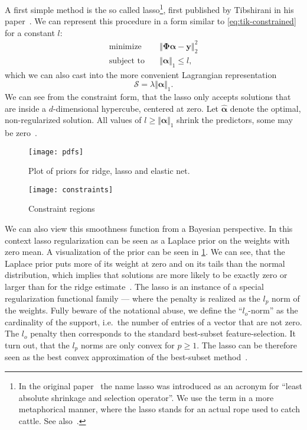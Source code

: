 A first simple method is the so called lasso\footnote{In the original
  paper~\cite{lasso} the name lasso  was introduced as an
  acronym for ``least absolute shrinkage and selection operator''.
We use the term in a more metaphorical manner, where the lasso stands for an
actual rope used to catch cattle. See also~\cite{sparse-learning}.},
first published by Tibshirani in his paper~\cite{lasso}. %
We can represent this procedure in a form similar to \cref{eq:tik-constrained} for a constant \(l\):
\begin{align}\label{eq:lasso-constrained}
\text{minimize} \quad &
 \left\Vert  \bm{\Phi} \bm{\alpha} - \bm{y}  \right\Vert_2^2 \\
\text{subject to} \quad & \Vert \bm{\alpha}  \Vert_1 \leq l,
\end{align}
which we can also cast into the more convenient Lagrangian representation
\begin{equation*}
\mathcal{S} = \lambda \Vert \bm{\alpha} \Vert_1.
\end{equation*}
We can see from the constraint form, that the lasso only accepts solutions that
are inside a \(d\)-dimensional hypercube, centered at zero.
Let \(\hat{\bm{\alpha}}\) denote the optimal, non-regularized solution.
All values of \(l \geq \Vert \bm{\alpha} \Vert_1\) shrink the predictors, some
may be zero~\cite{lasso}.

\begin{figure}[tb]
    \centering
    \texttt{[image: pdfs]}
    \caption{Plot of priors for ridge, lasso and elastic net.}\label{fig:reg-pdfs}
\end{figure}
\begin{figure}[tb]
    \centering
    \texttt{[image: constraints]}
    \caption{Constraint regions}
\end{figure}

We can also view this smoothness function from a Bayesian perspective.
In this context lasso regularization can be seen as a Laplace prior on the
weights with zero mean.
A visualization of the prior can be seen in \cref{fig:reg-pdfs}.
We can see, that the Laplace prior puts more of its weight at zero and on its
tails than the normal distribution, which implies that solutions are more likely
to be exactly zero or larger than for the ridge estimate~\cite{lasso}.
The lasso is an instance of a special regularization functional family --- where
the penalty is realized as the \(l_p\) norm of the weights.
Fully beware of the notational abuse, we define the ``\(l_o\)-norm'' as the
cardinality of the support, i.e.~the number of entries of a vector that are not
zero.
The \(l_o\) penalty then corresponds to the standard best-subset
feature-selection.
It turn out, that the \(l_p\) norms are only convex for \(p \geq 1\).
The lasso can be therefore seen as the best convex approximation of the
best-subset method~\cite{sparse-learning,lasso}.

